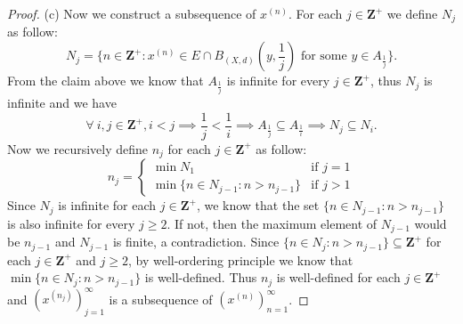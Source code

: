 \begin{proof}{(c)}
    Now we construct a subsequence of \(x^{(n)}\).
    For each \(j \in \mathbf{Z}^+\) we define \(N_j\) as follow:
    \[
        N_j = \bigg\{n \in \mathbf{Z}^+ : x^{(n)} \in E \cap B_{(X, d)}(y, \frac{1}{j}) \text{ for some } y \in A_{\frac{1}{j}}\bigg\}.
    \]
    From the claim above we know that \(A_{\frac{1}{j}}\) is infinite for every \(j \in \mathbf{Z}^+\), thus \(N_j\) is infinite and we have
    \[
        \forall\ i, j \in \mathbf{Z}^+, i < j \implies \frac{1}{j} < \frac{1}{i} \implies A_{\frac{1}{j}} \subseteq A_{\frac{1}{i}} \implies N_j \subseteq N_i.
    \]
    Now we recursively define \(n_j\) for each \(j \in \mathbf{Z}^+\) as follow:
    \[
        n_j = \begin{cases}
            \min N_1                                & \text{if } j = 1 \\
            \min\{n \in N_{j - 1} : n > n_{j - 1}\} & \text{if } j > 1
        \end{cases}
    \]
    Since \(N_j\) is infinite for each \(j \in \mathbf{Z}^+\), we know that the set \(\{n \in N_{j - 1} : n > n_{j - 1}\}\) is also infinite for every \(j \geq 2\).
    If not, then the maximum element of \(N_{j - 1}\) would be \(n_{j - 1}\) and \(N_{j - 1}\) is finite, a contradiction.
    Since \(\{n \in N_j : n > n_{j - 1}\} \subseteq \mathbf{Z}^+\) for each \(j \in \mathbf{Z}^+\) and \(j \geq 2\), by well-ordering principle we know that \(\min\{n \in N_j : n > n_{j - 1}\}\) is well-defined.
    Thus \(n_j\) is well-defined for each \(j \in \mathbf{Z}^+\) and \((x^{(n_j)})_{j = 1}^\infty\) is a subsequence of \((x^{(n)})_{n = 1}^\infty\).


\end{proof}
